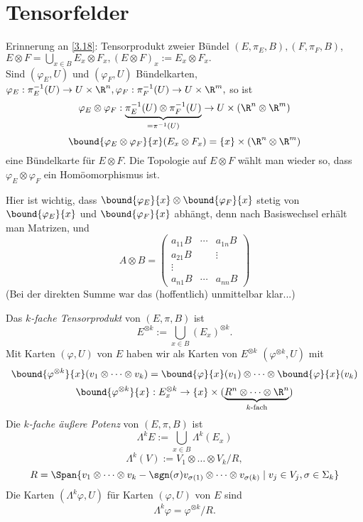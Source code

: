 \chapter{Tensorfelder}
\lecture

\begin{rem}
	Erinnerung an \ref{3.18}: Tensorprodukt zweier Bündel $ (E, \pi_E, B), (F, \pi_F,B)$, $E \otimes F = \bigcup_{x \in B} E_x \otimes F_x, (E \otimes F)_x := E_x \otimes F_x. $\\
	Sind $ (\varphi_E,U) $ und $(\varphi_F,U)$ Bündelkarten, $ \varphi_E: \pi_E^{-1}(U) \to U \times \R^n, \varphi_F: \pi_F^{-1}(U) \to U \times \R^m, $ so ist
	\[ \varphi_E \otimes \varphi_F: \underbrace{\pi_E^{-1}(U) \otimes \pi_F^{-1}(U)}_{= \pi^{-1}(U)} \to U \times (\R^n \otimes \R^m) \]
	\[ \bound{\varphi_E \otimes \varphi_F}{x}(E_x \otimes F_x) = \{x\} \times (\R^n \otimes \R^m) \]
	eine Bündelkarte für $E \otimes F$. Die Topologie auf $E \otimes F$ wählt man wieder so, dass $\varphi_E \otimes \varphi_F$ ein Homöomorphismus ist.
\end{rem}

\begin{rem*}
	Hier ist wichtig, dass $ \bound{\varphi_E}{x} \otimes  \bound{\varphi_F}{x} $ stetig von $ \bound{\varphi_E}{x} $ und $ \bound{\varphi_F}{x} $ abhängt, denn nach Basiswechsel erhält man Matrizen, und
	\[ A \otimes B = \begin{pmatrix}
		a_{11}B & \cdots & a_{1n}B\\
		a_{21}B & 		& \vdots\\
		\vdots &	&\\
		a_{n1}B & \cdots & a_{nn}B
	\end{pmatrix} \]
	(Bei der direkten Summe war das (hoffentlich) unmittelbar klar...)
\end{rem*}

\begin{defn}
	Das \emph{$k$-fache Tensorprodukt} von $ (E,\pi,B) $ ist
	\[ E^{\otimes k} := \bigcup_{x \in B} (E_x)^{\otimes k}. \]
	Mit Karten $(\varphi,U)$ von $E$ haben wir als Karten von $E^{\otimes k}$ $(\varphi^{\otimes k},U)$ mit
	\[ \bound{\varphi^{\otimes k}}{x} (v_1 \otimes \dots \otimes v_k) = \bound{\varphi}{x}(v_1) \otimes \dots \otimes \bound{\varphi}{x}(v_k) \]
	\[ \bound{\varphi^{\otimes k}}{x}: E_x^{\otimes k} \to \{x\} \times (\underbrace{R^n \otimes \dots \otimes \R^n}_{k\text{-fach}}) \]
	Die \emph{$k$-fache äußere Potenz} von $(E,\pi,B)$ ist
	\[ \Lambda^k E:= \bigcup_{x \in B} \Lambda^k(E_x) \]
	\[ \Lambda^k(V) := V_1 \otimes \dots \otimes V_k / R, \]
	\[ R = \Span\{v_1 \otimes \dots \otimes v_k - \sgn(\sigma) v_{\sigma(1)} \otimes \dots \otimes v_{\sigma(k)} \mid v_j \in V_j, \sigma \in \Sigma_k\} \]
	Die Karten $(\Lambda^k\varphi,U)$ für Karten $(\varphi,U)$ von $E$ sind
	\[ \Lambda^k\varphi = \varphi^{\otimes k}/R. \]
\end{defn}

